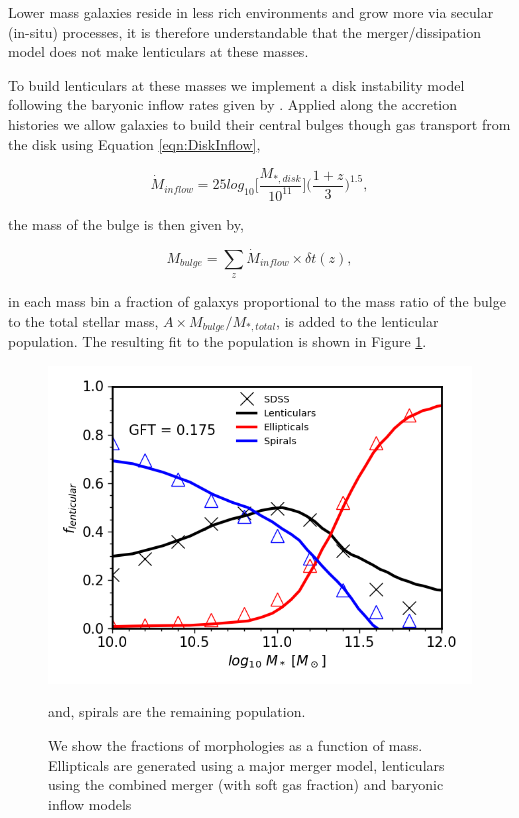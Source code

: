 Lower mass galaxies reside in less rich environments and grow more via secular (in-situ) processes, it is therefore understandable that the merger/dissipation model does not make lenticulars at these masses.

To build lenticulars at these masses we implement a disk instability model following the baryonic inflow rates given by \citet{Bournaud2011BLACKSTREAMS}. Applied along the accretion histories we allow galaxies to build their central bulges though gas transport from the disk using Equation \ref{eqn:DiskInflow}, 

\begin{equation}
    \label{eqn:DiskInflow}
    \dot{M}_{inflow} = 25 log_{10}\Big[\frac{M_{*,disk}}{10^{11}}\Big]\Big(\frac{1 + z}{3}\Big)^{1.5},
\end{equation}

the mass of the bulge is then given by,

\begin{equation}
    M_{bulge} = \sum_z \dot{M}_{inflow} \times \delta t(z),
\end{equation}

in each mass bin a fraction of galaxys proportional to the mass ratio of the bulge to the total stellar mass, $A \times M_{bulge} / M_{*, total}$, is added to the lenticular population. The resulting fit to the population is shown in Figure \ref{fig:All_Morphologies}.

\begin{figure}
  \includegraphics[width=\linewidth]{Figures/Chapter5/Bulge_Growth_Final_All_Morph.png}
    \caption{We show the fractions of morphologies as a function of mass. Ellipticals are generated using a major merger model, lenticulars using the combined merger (with soft gas fraction) and baryonic inflow models} and, spirals are the remaining population.
    \label{fig:All_Morphologies}
\end{figure}

